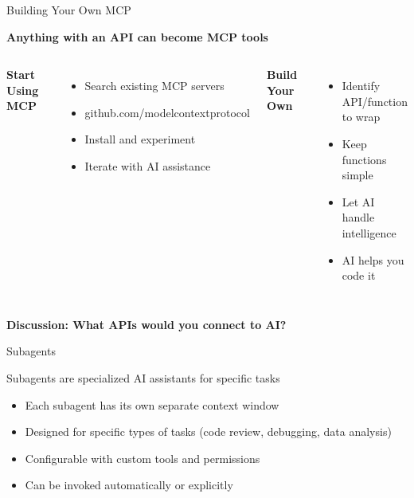 \documentclass[aspectratio=169]{beamer}
\begin{document}
\begin{frame}{Building Your Own MCP}

\vspace{0.3cm}
\centering
\Large
\textbf{Anything with an API can become MCP tools}

\vspace{0.5cm}

\begin{columns}[t]

\centering
\textbf{\large Start Using MCP}
\vspace{0.4cm}

\normalsize
\begin{itemize}
\item Search existing MCP servers
\item github.com/modelcontextprotocol
\item Install and experiment
\item Iterate with AI assistance
\end{itemize}

\centering
\textbf{\large Build Your Own}
\vspace{0.4cm}

\normalsize
\begin{itemize}
\item Identify API/function to wrap
\item Keep functions simple
\item Let AI handle intelligence
\item AI helps you code it
\end{itemize}

\end{columns}

\vspace{0.8cm}
\centering
\Large
\textbf{Discussion: What APIs would you connect to AI?}

\end{frame}

\begin{frame}{Subagents}

\vspace{0.5cm}
\centering
\Large
Subagents are specialized AI assistants for specific tasks

\vspace{0.8cm}

\normalsize
\begin{itemize}
\item Each subagent has its own separate context window
\item Designed for specific types of tasks (code review, debugging, data analysis)
\item Configurable with custom tools and permissions
\item Can be invoked automatically or explicitly
\end{itemize}

\end{frame}
\end{document}
